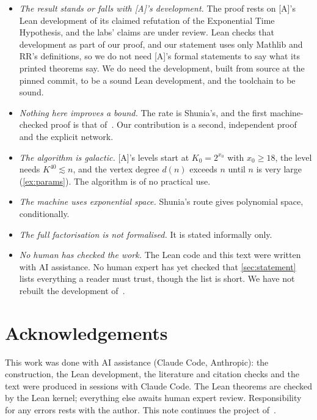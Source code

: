 \documentclass[10pt]{amsart}
\theoremstyle{plain}
\theoremstyle{definition}
\theoremstyle{remark}
\numberwithin{equation}{section}
\newcommand{\A}{\textup{[A]}}
\begin{document}
\begin{itemize}
\item \emph{The result stands or falls with \A's development.} The proof rests on \A's Lean development
of its claimed refutation of the Exponential Time Hypothesis, and the labs' claims are under review.
Lean checks that development as part of our proof, and our statement uses only Mathlib and RR's
definitions, so we do not need \A's formal statements to say what its printed theorems say. We do need
the development, built from source at the pinned commit, to be a sound Lean development, and the
toolchain to be sound.
\item \emph{Nothing here improves a bound.} The rate is Shunia's, and the first machine-checked proof is
that of~\cite{IF26}. Our contribution is a second, independent proof and the explicit network.
\item \emph{The algorithm is galactic.} \A's levels start at $K_0=2^{x_0}$ with $x_0\ge18$, the level needs
$K^{40}\lesssim n$, and the vertex degree $d(n)$ exceeds $n$ until $n$ is very large
(\cref{ex:params}). The algorithm is of no practical use.
\item \emph{The machine uses exponential space.} Shunia's route gives polynomial space, conditionally.
\item \emph{The full factorisation is not formalised.} It is stated informally only.
\item \emph{No human has checked the work.} The Lean code and this text were written with AI assistance.
No human expert has yet checked that \cref{sec:statement} lists everything a reader must trust, though
the list is short. We have not rebuilt the development of~\cite{IF26}.
\end{itemize}

\section*{Acknowledgements}
This work was done with AI assistance (Claude Code, Anthropic): the construction, the Lean
development, the literature and citation checks and the text were produced in sessions with Claude
Code. The Lean theorems are checked by the Lean kernel; everything else awaits human expert review.
Responsibility for any errors rests with the author. This note continues the project
of~\cite{Tulsyan26}.
\end{document}
